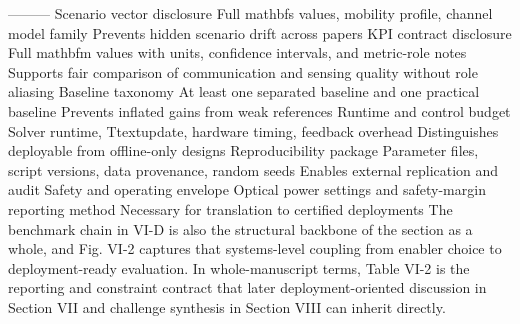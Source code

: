 {}\markdownRendererPipe{}---\markdownRendererPipe{}---\markdownRendererPipe{}---\markdownRendererPipe{}\markdownRendererSoftLineBreak
{}\markdownRendererPipe{} Scenario vector disclosure \markdownRendererPipe{} Full \markdownRendererDollarSign{}\markdownRendererBackslash{}mathbf\markdownRendererLeftBrace{}s\markdownRendererRightBrace{}\markdownRendererDollarSign{} values, mobility profile, channel model family \markdownRendererPipe{} Prevents hidden scenario drift across papers \markdownRendererPipe{}\markdownRendererSoftLineBreak
{}\markdownRendererPipe{} KPI contract disclosure \markdownRendererPipe{} Full \markdownRendererDollarSign{}\markdownRendererBackslash{}mathbf\markdownRendererLeftBrace{}m\markdownRendererRightBrace{}\markdownRendererDollarSign{} values with units, confidence intervals, and metric-role notes \markdownRendererPipe{} Supports fair comparison of communication and sensing quality without role aliasing \markdownRendererPipe{}\markdownRendererSoftLineBreak
{}\markdownRendererPipe{} Baseline taxonomy \markdownRendererPipe{} At least one separated baseline and one practical baseline \markdownRendererPipe{} Prevents inflated gains from weak references \markdownRendererPipe{}\markdownRendererSoftLineBreak
{}\markdownRendererPipe{} Runtime and control budget \markdownRendererPipe{} Solver runtime, \markdownRendererDollarSign{}T\markdownRendererUnderscore{}\markdownRendererLeftBrace{}\markdownRendererBackslash{}text\markdownRendererLeftBrace{}update\markdownRendererRightBrace{}\markdownRendererRightBrace{}\markdownRendererDollarSign{}, hardware timing, feedback overhead \markdownRendererPipe{} Distinguishes deployable from offline-only designs \markdownRendererPipe{}\markdownRendererSoftLineBreak
{}\markdownRendererPipe{} Reproducibility package \markdownRendererPipe{} Parameter files, script versions, data provenance, random seeds \markdownRendererPipe{} Enables external replication and audit \markdownRendererPipe{}\markdownRendererSoftLineBreak
{}\markdownRendererPipe{} Safety and operating envelope \markdownRendererPipe{} Optical power settings and safety-margin reporting method \markdownRendererPipe{} Necessary for translation to certified deployments \markdownRendererPipe{}\markdownRendererParagraphSeparator
{}The benchmark chain in VI-D is also the structural backbone of the section as a whole, and Fig. VI-2 captures that systems-level coupling from enabler choice to deployment-ready evaluation. In whole-manuscript terms, Table VI-2 is the reporting and constraint contract that later deployment-oriented discussion in Section VII and challenge synthesis in Section VIII can inherit directly.\markdownRendererParagraphSeparator
